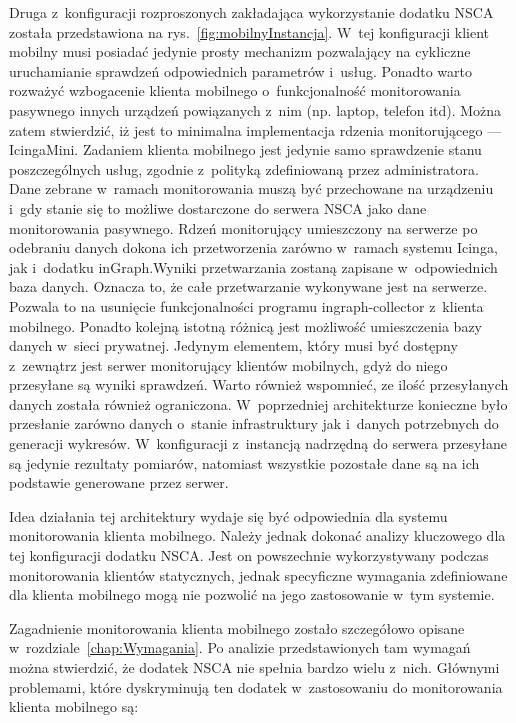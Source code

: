 Druga z~konfiguracji rozproszonych zakładająca wykorzystanie dodatku
NSCA została przedstawiona na rys.~\ref{fig:mobilnyInstancja}. W~tej
konfiguracji klient mobilny musi posiadać jedynie prosty mechanizm
pozwalający na cykliczne uruchamianie sprawdzeń odpowiednich
parametrów i~usług. Ponadto warto rozważyć wzbogacenie klienta
mobilnego o~funkcjonalność monitorowania pasywnego innych urządzeń
powiązanych z~nim (np. laptop, telefon itd). Można zatem stwierdzić,
iż jest to minimalna implementacja rdzenia monitorującego ---
IcingaMini. Zadaniem klienta mobilnego jest jedynie samo sprawdzenie
stanu poszczególnych usług, zgodnie z~polityką zdefiniowaną przez
administratora. Dane zebrane w~ramach monitorowania muszą być
przechowane na urządzeniu i~gdy stanie się to możliwe dostarczone do
serwera NSCA jako dane monitorowania pasywnego. Rdzeń monitorujący
umieszczony na serwerze po odebraniu danych dokona ich przetworzenia
zarówno w~ramach systemu Icinga, jak i~dodatku inGraph.Wyniki
przetwarzania zostaną zapisane w~odpowiednich baza danych. Oznacza to,
że całe przetwarzanie wykonywane jest na serwerze. Pozwala to na
usunięcie funkcjonalności programu ingraph-collector z~klienta
mobilnego. Ponadto kolejną istotną różnicą jest możliwość umieszczenia
bazy danych w~sieci prywatnej. Jedynym elementem, który musi być
dostępny z~zewnątrz jest serwer monitorujący klientów mobilnych, gdyż
do niego przesyłane są wyniki sprawdzeń. Warto również wspomnieć, ze
ilość przesyłanych danych została również ograniczona. W~poprzedniej
architekturze konieczne było przesłanie zarówno danych o~stanie
infrastruktury jak i~danych potrzebnych do generacji
wykresów. W~konfiguracji z~instancją nadrzędną do serwera przesyłane
są jedynie rezultaty pomiarów, natomiast wszystkie pozostałe dane są
na ich podstawie generowane przez serwer.

Idea działania tej architektury wydaje się być odpowiednia dla systemu
monitorowania klienta mobilnego. Należy jednak dokonać analizy
kluczowego dla tej konfiguracji dodatku NSCA. Jest on powszechnie
wykorzystywany podczas monitorowania klientów statycznych, jednak
specyficzne wymagania zdefiniowane dla klienta mobilnego mogą nie
pozwolić na jego zastosowanie w~tym systemie.

Zagadnienie monitorowania klienta mobilnego zostało szczegółowo
opisane w~rozdziale~\ref{chap:Wymagania}. Po analizie przedstawionych
tam wymagań można stwierdzić, że dodatek NSCA nie spełnia bardzo wielu
z~nich. Głównymi problemami, które dyskryminują ten dodatek
w~zastosowaniu do monitorowania klienta mobilnego są:

